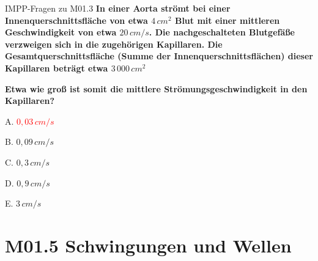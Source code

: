 \documentclass{beamer}
\begin{document}
\begin{frame}{IMPP-Fragen zu M01.3}
    \textbf{In einer Aorta strömt bei einer Innenquerschnittsfläche von etwa \(4\,cm^2\) Blut mit einer mittleren Geschwindigkeit von etwa \(20\,cm/s\). Die nachgeschalteten Blutgefäße verzweigen sich in die zugehörigen Kapillaren. Die Gesamtquerschnittsfläche (Summe der Innenquerschnittsflächen) dieser Kapillaren beträgt etwa \(3\,000\,cm^2\)}
    
    \textbf{
    Etwa wie groß ist somit die mittlere Strömungsgeschwindigkeit in den Kapillaren?
    }\\[0.2 cm]

\begin{description}
\item{A.} \textcolor{red}{\(0,03\,cm/s\)}
\item{B.} \(0,09\,cm/s\)
\item{C.} \(0,3\,cm/s\)
\item{D.} \(0,9\,cm/s\)
\item{E.} \(3\,cm/s\)

\end{description}
\end{frame}



\section{M01.5 Schwingungen und Wellen}



\end{document}
